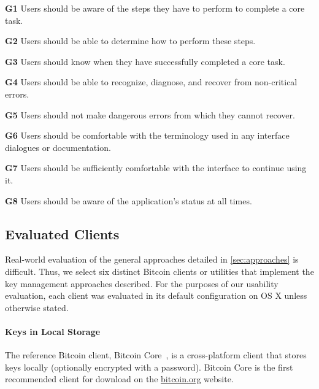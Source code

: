 	
\begin{compactlist}
	\item[\bf G1] Users should be aware of the steps they have to perform to complete a core task.
	\item[\bf G2] Users should be able to determine how to perform these steps.
	\item[\bf G3] Users should know when they have successfully completed a core task.
	\item[\bf G4] Users should be able to recognize, diagnose, and recover from non-critical errors.
	\item[\bf G5] Users should not make dangerous errors from which they cannot recover.
	\item[\bf G6] Users should be comfortable with the terminology used in any interface dialogues or documentation.
	\item[\bf G7] Users should be sufficiently comfortable with the interface to continue using it.
	\item[\bf G8] Users should be aware of the application's status at all times.
\end{compactlist}



\subsection{Evaluated Clients}
Real-world evaluation of the general approaches detailed in \autoref{sec:approaches} is difficult. Thus, we select six distinct Bitcoin clients or utilities that implement the key management approaches described. For the purposes of our usability evaluation, each client was evaluated in its default configuration on OS X unless otherwise stated. 

\paragraph{Keys in Local Storage} The reference Bitcoin client, Bitcoin Core~\cite{bitcoinqt}, is a cross-platform client that stores keys locally (optionally encrypted with a password). Bitcoin Core is the first recommended client for download on the \url{bitcoin.org} website. 


